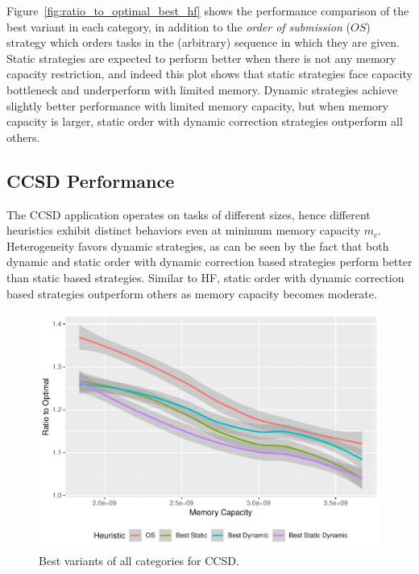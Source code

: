 \documentclass[sigconf]{acmart}
\begin{document}
{	
		
		Figure~\ref{fig:ratio_to_optimal_best_hf} shows the performance comparison of the best variant in each category, in addition to the \textit{order of submission} ($OS$) strategy which orders tasks in the (arbitrary) sequence in which they are given. Static strategies are expected to perform better when there is not any memory capacity restriction, and indeed this plot shows that static strategies face capacity bottleneck and underperform with limited memory. Dynamic strategies achieve slightly better performance with limited memory capacity, but when memory capacity is larger, static order with dynamic correction strategies outperform all others.
		
		
		\subsection{CCSD Performance}

		
		The CCSD application operates on tasks of different sizes, hence different heuristics exhibit distinct behaviors even at minimum memory capacity $m_c$. Heterogeneity favors dynamic strategies, as can be seen by the fact that both dynamic and static order with dynamic correction based strategies perform better than static based strategies. Similar to HF, static order with dynamic correction based strategies outperform others as memory capacity becomes moderate. 
		
\begin{figure}[htb]
	\includegraphics[scale=0.5]{./results/ratio_to_optimal_ccsd-best.pdf}
	\vspace*{-0.25cm}\caption{Best variants of all categories for CCSD.\vspace*{-0.25cm}}
	\label{fig:ratio_to_optimal_best_ccsd}
\end{figure}
		
}
\end{document}
